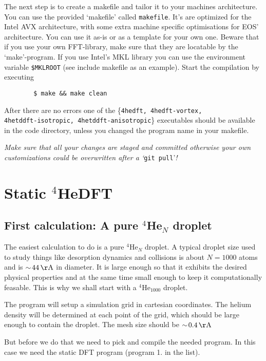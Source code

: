 \documentclass[10pt,a4paper]{article}
\begin{document}
	The next step is to create a makefile and tailor it to your machines architecture. You can use the provided `makefile' called \verb|makefile|. It's are optimized for the Intel AVX architecture, with some extra machine specific optimisations for EOS' architecture. You can use it as-is or as a template for your own one. Beware that if you use your own FFT-library, make sure that they are locatable by the `make'-program. If you use Intel's MKL library you can use the environment variable \verb|$MKLROOT| (see include makefile as an example). Start the compilation by executing
	\begin{verbatim}
		$ make && make clean
	\end{verbatim}
	After there are no errors one of the \{\verb|4hedft, 4hedft-vortex,| \\ \verb|4hetddft-isotropic, 4hetddft-anisotropic|\} executables should be available in the code directory, unless you changed the program name in your makefile.

	{\color{red}\emph{Make sure that all your changes are staged and committed otherwise your own customizations could be overwritten after a `}\verb|git pull|'\emph{!}}
	
	\newpage
	\section{Static $^4$HeDFT}
	
	\subsection{First calculation: A pure $^4$He$_N$ droplet}
	The easiest calculation to do is a pure $^4$He$_N$ droplet. A typical droplet size used to study things like desorption dynamics and collisions is about $N=1000$ atoms and is $\sim\!44\,\mathrm{\AA}$ in diameter. It is large enough so that it exhibits the desired physical properties and at the same time small enough to keep it computationally feasable. This is why we shall start with a $^4$He$_{1000}$ droplet.
	
	The program will setup a simulation grid in cartesian coordinates. The helium density will be determined at each point of the grid, which should be large enough to contain the droplet. The mesh size should be $\sim\!0.4\,\mathrm{\AA}$
	
	But before we do that we need to pick and compile the needed program. In this case we need the static DFT program (program 1. in the list).
	
\end{document}

